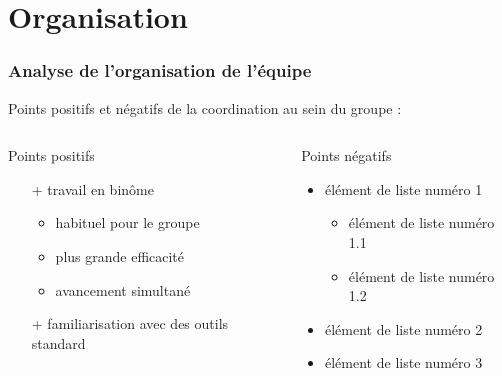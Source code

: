 \section{Organisation}

\begin{frame}
\tableofcontents[currentsection]
\end{frame}
\begin{frame}

\frametitle{Analyse de l'organisation de l'équipe}
Points positifs et négatifs de la coordination au sein du groupe :

\bigskip
  \begin{columns}[t]
  \begin{column}{5cm}
  \begin{exampleblock}{Points positifs}
\begin{itemize}
    \item[+] travail en binôme
      \begin{itemize}
      \item habituel pour le groupe
      \item plus grande efficacité
      \item avancement simultané
      \end{itemize}
    \item[+] familiarisation avec des outils standard  
  \end{itemize}
  \end{exampleblock} 
  \end{column}
  
  \begin{column}{5cm}
  \begin{alertblock}{Points négatifs}
\begin{itemize}
    \item élément de liste numéro 1
      \begin{itemize}
      \item élément de liste numéro 1.1
      \item élément de liste numéro 1.2
      \end{itemize}
    \item élément de liste numéro 2
    \item élément de liste numéro 3 
  \end{itemize}
  \end{alertblock}   
  \end{column}
  \end{columns}  

\end{frame}
